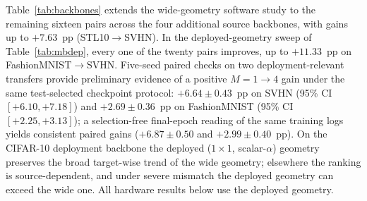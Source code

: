 \documentclass[journal]{IEEEtran}
\begin{document}
\begin{table}[!t]
\centering
\caption{Multi-branch scaling on the CIFAR-10 backbone (wide geometry, software, 1W1A, RC).}
\label{tab:mbsw}
\small
\setlength{\tabcolsep}{3.5pt}
\end{table}

Table~\ref{tab:backbones} extends the wide-geometry software study to the remaining sixteen pairs across the four additional source backbones, with gains up to $+7.63$~pp (STL10$\to$SVHN). In the deployed-geometry sweep of Table~\ref{tab:mbdep}, every one of the twenty pairs improves, up to $+11.33$~pp on FashionMNIST$\to$SVHN. Five-seed paired checks on two deployment-relevant transfers provide preliminary evidence of a positive $M{=}1{\to}4$ gain under the same test-selected checkpoint protocol: $+6.64 \pm 0.43$~pp on SVHN (95\% CI $[+6.10, +7.18]$) and $+2.69 \pm 0.36$~pp on FashionMNIST (95\% CI $[+2.25, +3.13]$); a selection-free final-epoch reading of the same training logs yields consistent paired gains ($+6.87 \pm 0.50$ and $+2.99 \pm 0.40$~pp). On the CIFAR-10 deployment backbone the deployed ($1{\times}1$, scalar-$\alpha$) geometry preserves the broad target-wise trend of the wide geometry; elsewhere the ranking is source-dependent, and under severe mismatch the deployed geometry can exceed the wide one. All hardware results below use the deployed geometry.
\end{document}
